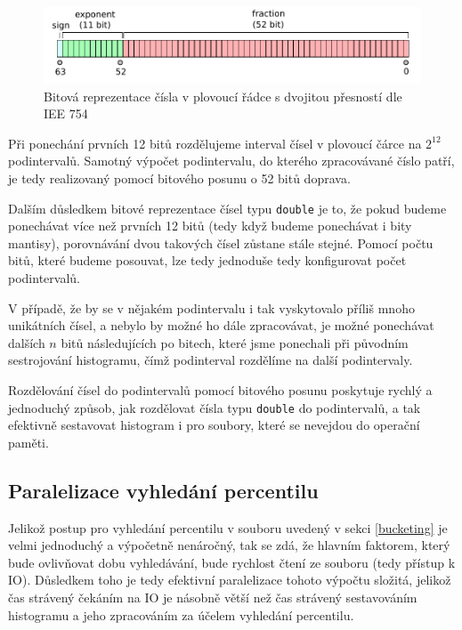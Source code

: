 \documentclass[12pt, a4paper]{article}
\begin{document}
\begin{figure}[!ht]
    \centering 
    \includegraphics[width=1\textwidth]{pdf/double.pdf}
    \caption{Bitová reprezentace čísla v plovoucí řádce s dvojitou přesností dle IEE 754}
\end{figure}

Při ponechání prvních 12 bitů rozdělujeme interval čísel v plovoucí čárce na $2^{12}$ podintervalů.
Samotný výpočet podintervalu, do kterého zpracovávané číslo patří, je tedy realizovaný pomocí bitového posunu o 52 bitů doprava.

Dalším důsledkem bitové reprezentace čísel typu \texttt{double} je to, že pokud budeme ponechávat více než prvních 12 bitů (tedy když budeme ponechávat i bity mantisy), porovnávání dvou takových čísel zůstane stále stejné.
Pomocí počtu bitů, které budeme posouvat, lze tedy jednoduše tedy konfigurovat počet podintervalů.

V případě, že by se v nějakém podintervalu i tak vyskytovalo příliš mnoho unikátních čísel, a nebylo by možné ho dále zpracovávat, je možné ponechávat dalších $n$ bitů následujících po bitech, které jsme ponechali při původním sestrojování histogramu, čímž podinterval rozdělíme na další podintervaly.

Rozdělování čísel do podintervalů pomocí bitového posunu poskytuje rychlý a jednoduchý způsob, jak rozdělovat čísla typu \texttt{double} do podintervalů, a tak efektivně sestavovat histogram i pro soubory, které se nevejdou do operační paměti.

\subsection{Paralelizace vyhledání percentilu}\label{parallel-bucketing}
Jelikož postup pro vyhledání percentilu v souboru uvedený v sekci \ref{bucketing} je velmi jednoduchý a výpočetně nenáročný, tak se zdá, že hlavním faktorem, který bude ovlivňovat dobu vyhledávání, bude rychlost čtení ze souboru (tedy přístup k IO).
Důsledkem toho je tedy efektivní paralelizace tohoto výpočtu složitá, jelikož čas strávený čekáním na IO je násobně větší než čas strávený sestavováním histogramu a jeho zpracováním za účelem vyhledání percentilu.
\end{document}
